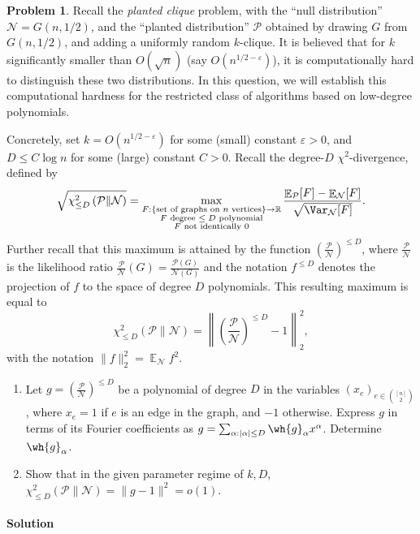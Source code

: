 \documentclass[11pt]{article}
\theoremstyle{definition}
\newtheorem{problem}[theorem]{Problem}
\newcommand{\R}{\mathbb{R}} %
\renewcommand{\epsilon}{\varepsilon}
\newcommand{\eps}{\epsilon}
\DeclareMathOperator{\E}{\mathbb{E}} %
\begin{document}
\begin{problem}
  Recall the \emph{planted clique} problem, with the ``null distribution'' $\mathcal{N} = G(n,1/2)$, and the ``planted distribution'' $\mathcal{P}$ obtained by drawing $G$ from $G(n,1/2)$, and adding a uniformly random $k$-clique. It is believed that for $k$ significantly smaller than $O(\sqrt{n})$ (say $O(n^{1/2 - \eps})$), it is computationally hard to distinguish these two distributions. In this question, we will establish this computational hardness for the restricted class of algorithms based on low-degree polynomials.

  Concretely, set $k = O(n^{1/2 - \eps})$ for some (small) constant $\eps > 0$, and $D \le C \log n$ for some (large) constant $C > 0$. Recall the degree-$D$ $\chi^2$-divergence, defined by
  \[ \sqrt{ \chi^2_{\le D}\left( \mathcal{P} \| \mathcal{N} \right) } = \max_{\substack{F : \{ \text{set of graphs on $n$ vertices} \} \to \R \\ F \text{ degree $\le D$ polynomial} \\ F \text{ not identically $0$}}} \frac{ \E_{\mathcal{P}}[F] - \E_{\mathcal{N}}[F] }{\sqrt{\Var_{\mathcal{N}}[F]}}. \]
  Further recall that this maximum is attained by the function $\left( \frac{\mathcal{P}}{\mathcal{N}} \right)^{\le D}$, where $\frac{\mathcal{P}}{\mathcal{N}}$ is the likelihood ratio $\frac{\mathcal{P}}{\mathcal{N}}(G) = \frac{\mathcal{P}(G)}{\mathcal{N}(G)}$ and the notation $f^{\le D}$ denotes the projection of $f$ to the space of degree $D$ polynomials. This resulting maximum is equal to
  \[ \chi^2_{\le D} \left( \mathcal{P} \| \mathcal{N} \right) = \left\| \left( \frac{\mathcal{P}}{\mathcal{N}} \right)^{\le D} - 1 \right\|_2^2, \]
  with the notation $\|f\|_2^2 = \E_{\mathcal{N}} f^2$.

  \begin{enumerate}[label=(\alph*)]
    \item Let $g = \left( \frac{\mathcal{P}}{\mathcal{N}} \right)^{\le D}$ be a polynomial of degree $D$ in the variables $(x_e)_{e \in \binom{[n]}{2}}$, where $x_e = 1$ if $e$ is an edge in the graph, and $-1$ otherwise. Express $g$ in terms of its Fourier coefficients as $g = \sum_{\alpha : |\alpha| \le D} \wh{g}_{\alpha} x^\alpha$. Determine $\wh{g}_\alpha$.
    \item Show that in the given parameter regime of $k,D$, $\chi^2_{\le D}\left( \mathcal{P} \| \mathcal{N} \right) = \|g - 1\|^2 = o(1)$.
  \end{enumerate}
\end{problem}

\paragraph{Solution}
\end{document}
